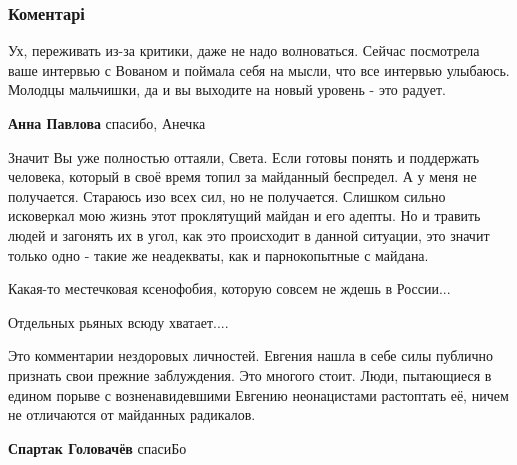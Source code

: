  
 
 
 
 
\subsubsection{Коментарі}
\label{sec:16_09_2021.fb.svetilkin_lanna.1.sharlotka_bilchenko_grazhdanstvo.cmt}

\begin{itemize} %

Ух, переживать из-за критики, даже не надо волноваться. Сейчас посмотрела ваше
интервью с Вованом и поймала себя на мысли, что все интервью улыбаюсь. Молодцы
мальчишки, да и вы выходите на новый уровень - это радует.

\begin{itemize} %
\textbf{Анна Павлова} спасибо, Анечка
\end{itemize} %


Значит Вы уже полностью оттаяли, Света. Если готовы понять и поддержать
человека, который в своё время топил за майданный беспредел. А у меня не
получается. Стараюсь изо всех сил, но не получается. Слишком сильно исковеркал
мою жизнь этот проклятущий майдан и его адепты. Но и травить людей и загонять
их в угол, как это происходит в данной ситуации, это значит только одно - такие
же неадекваты, как и парнокопытные с майдана.


Какая-то местечковая ксенофобия, которую совсем не ждешь в России...

Отдельных рьяных всюду хватает....


Это комментарии нездоровых личностей. Евгения нашла в себе силы публично
признать свои прежние заблуждения. Это многого стоит. Люди, пытающиеся в едином
порыве с возненавидевшими Евгению неонацистами растоптать её, ничем не
отличаются от майданных радикалов.

\begin{itemize} %
\textbf{Спартак Головачёв} спасиБо
\end{itemize} %


\end{itemize}
